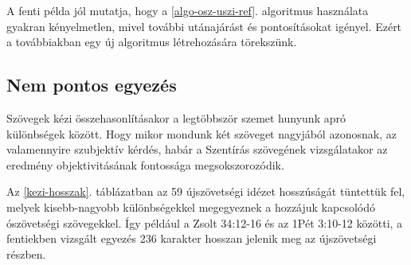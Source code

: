 \documentclass{article}
\begin{document}
A fenti példa jól mutatja, hogy a \ref{algo-osz-uszi-ref}. algoritmus használata gyakran
kényelmetlen, mivel további utánajárást és pontosításokat igényel. Ezért a továbbiakban
egy új algoritmus létrehozására törekszünk.

\subsection{Nem pontos egyezés}

Szövegek kézi összehasonlításakor a legtöbbször szemet hunyunk apró különbségek
között. Hogy mikor mondunk két szöveget nagyjából azonosnak, az valamennyire
szubjektív kérdés, habár a Szentírás szövegének vizsgálatakor
az eredmény objektivitásának fontossága megsokszorozódik.

Az \ref{kezi-hosszak}. táblázatban az 59 újszövetségi idézet hosszúságát tüntettük fel,
melyek kisebb-nagyobb különbségekkel megegyeznek a hozzájuk kapcsolódó ószövetségi
szövegekkel. Így például a Zsolt 34:12-16 és az 1Pét 3:10-12 közötti, a fentiekben
vizsgált egyezés 236 karakter hosszan jelenik meg az újszövetségi részben.
\end{document}
